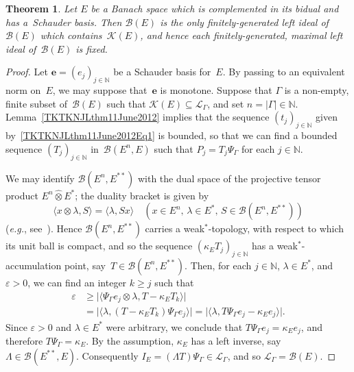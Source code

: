 \documentclass[12pt]{amsart}
\newtheorem{theorem}{Theorem}[section]
\theoremstyle{definition}
\numberwithin{equation}{section}
\begin{document}
\begin{theorem}\label{Thmlp}
  Let $E$ be a Banach space which is complemented in its bi\-dual and
  has a~Schauder basis. Then $\mathscr{B}(E)$ is the only
  finitely-generated left ideal of~$\mathscr{B}(E)$ which
  contains~$\mathscr{K}(E)$, and hence each finitely-generated,
  maximal left ideal of~$\mathscr{B}(E)$ is fixed.
\end{theorem}
\begin{proof}
  Let $\mathbf{e} = (e_j)_{j\in{\ensuremath{\mathbb{N}}}}$ be a Schauder basis for~$E$. By
  passing to an equivalent norm on~$E$, we may suppose
  that~$\mathbf{e}$ is monotone.  Suppose that $\Gamma$ is a
  non-empty, finite subset of~$\mathscr{B}(E)$ such that
  $\mathscr{K}(E)\subseteq\mathscr{L}_{\Gamma}$, and set $n =
  |\Gamma|\in{\ensuremath{\mathbb{N}}}$. Lemma~\ref{TKTKNJLthm11June2012} implies that the
  sequence $(t_j)_{j\in{\ensuremath{\mathbb{N}}}}$ given by~\eqref{TKTKNJLthm11June2012Eq1}
  is bounded, so that we can find a bounded sequence $(T_j)_{j\in{\ensuremath{\mathbb{N}}}}$
  in~$\mathscr{B}(E^n,E)$ such that $P_j = T_j\Psi_{\Gamma}$ for each
  $j\in{\ensuremath{\mathbb{N}}}$.

  We may identify $\mathscr{B}(E^n,E^{**})$ with the dual space of the
  projective tensor product $E^n\widehat{\otimes}E^*$; the duality
  bracket is given by
  \[ \langle x\otimes\lambda, S\rangle = \langle \lambda,
  Sx\rangle\quad (x\in E^n,\, \lambda\in E^*,\,
  S\in\mathscr{B}(E^n,E^{**})) \] (\emph{e.g.},
  see~\cite[Proposition~A.3.70]{dales}). Hence
  $\mathscr{B}(E^n,E^{**})$ carries a weak$^*$-topol\-o\-gy, with
  respect to which its unit ball is compact, and so the sequence
  $(\kappa_E T_j)_{j\in{\ensuremath{\mathbb{N}}}}$ has a weak$^*$-accumulation point,
  say~$T\in\mathscr{B}(E^{n},E^{**})$. Then, for each $j\in{\ensuremath{\mathbb{N}}}$,
  $\lambda\in E^*$, and ${\ensuremath{\varepsilon}} >0$, we can find an integer $k{\ensuremath{\geqslant}} j$
  such that
  \begin{align*}
    {\ensuremath{\varepsilon}} &{\ensuremath{\geqslant}} \bigl|\langle\Psi_{\Gamma}e_j\otimes\lambda,
    T-\kappa_E T_k\rangle\bigr|\\ &= \bigl|\langle\lambda, (T -
    \kappa_E T_k)\Psi_{\Gamma}e_j\rangle\bigr| = \bigl|\langle\lambda,
    T\Psi_{\Gamma}e_j -\kappa_E e_j\rangle\bigr|.
  \end{align*}
  Since ${\ensuremath{\varepsilon}}>0$ and $\lambda\in E^*$ were arbitrary, we conclude
  that $T\Psi_{\Gamma}e_j =\kappa_E e_j$, and therefore
  $T\Psi_{\Gamma} =\kappa_E$.  By the assumption, $\kappa_E$ has a
  left inverse, say
  \mbox{$\Lambda\in\mathscr{B}(E^{**},E)$}. Consequently $I_E =
  (\Lambda T)\Psi_{\Gamma}\in\mathscr{L}_{\Gamma}$, and so
  $\mathscr{L}_{\Gamma} = \mathscr{B}(E)$.
\end{proof}
\end{document}
